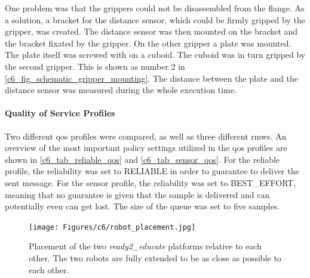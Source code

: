 One problem was that the grippers could not be disassembled from the flange. As a solution, a bracket for the distance sensor, which could be firmly gripped by the gripper, was created. The distance sensor was then mounted on the bracket and the bracket fixated by the gripper. On the other gripper a plate was mounted. The plate itself was screwed with on a cuboid. The cuboid was in turn gripped by the second gripper. This is shown as number 2 in \autoref{c6_fig_schematic_gripper_mounting}. The distance between the plate and the distance sensor was measured during the whole execution time.

\paragraph{Quality of Service Profiles}
Two different \gls{qos} profiles were compared, as well as three different \glspl{rmw}. An overview of the most important policy settings utilized in the \gls{qos} profiles are shown in \autoref{c6_tab_reliable_qos} and \autoref{c6_tab_sensor_qos}. For the reliable profile, the reliability was set to RELIABLE in order to guarantee to deliver the sent message. For the sensor profile, the reliability was set to BEST\_EFFORT, meaning that no guarantee is given that the sample is delivered and can potentially even can get lost. The size of the queue was set to five samples. 
\begin{figure}[H]
	\centering
	\texttt{[image: Figures/c6/robot\_placement.jpg]}
	\caption{Placement of the two \textit{ready2\_educate} platforms relative to each other. The two robots are fully extended to be as close as possible to each other. }
	\label{c6_fig_robot_placement}
\end{figure}
